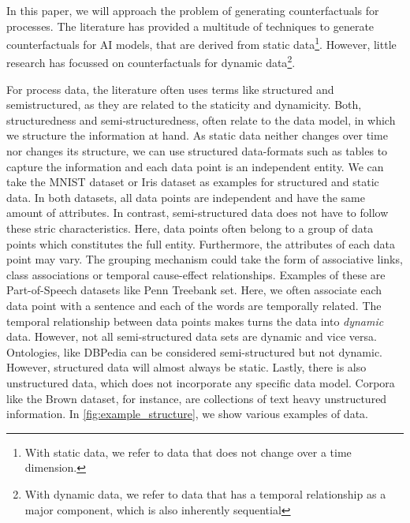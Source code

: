 \documentclass[./../../paper.tex]{subfiles}
\begin{document}
In this paper, we will approach the problem of generating counterfactuals for processes. The literature has provided a multitude of techniques to generate counterfactuals for AI models, that are derived from static data\footnote{With static data, we refer to data that does not change over a time dimension.}. However, little research has focussed on counterfactuals for dynamic data\footnote{With dynamic data, we refer to data that has a temporal relationship as a major component, which is also inherently sequential}.  

For process data, the literature often uses terms like structured and semistructured, as they are related to the staticity and dynamicity. Both, structuredness and semi-structuredness, often relate to the data model, in which we structure the information at hand. As static data neither changes over time nor changes its structure, we can use structured data-formats such as tables to capture the information and each data point is an independent entity. We can take the MNIST dataset\needscite{} or Iris dataset\needscite{} as examples for structured and static data. In both datasets, all data points are independent and have the same amount of attributes. In contrast, semi-structured data does not have to follow these stric characteristics. Here, data points often belong to a group of data points which constitutes the full entity. Furthermore, the attributes of each data point may vary. The grouping mechanism could take the form of associative links, class associations or temporal cause-effect relationships. Examples of these are Part-of-Speech datasets like Penn Treebank set\needscite{}. Here, we often associate each data point with a sentence and each of the words are temporally related. The temporal relationship between data points makes turns the data into \emph{dynamic} data. However, not all semi-structured data sets are dynamic and vice versa. Ontologies, like DBPedia can be considered semi-structured but not dynamic. However, structured data will almost always be static. Lastly, there is also unstructured data, which does not incorporate any specific data model. Corpora like the Brown dataset\needscite{}, for instance, are collections of text heavy unstructured information. In \autoref{fig:example_structure}, we show various examples of data.

\end{document}

